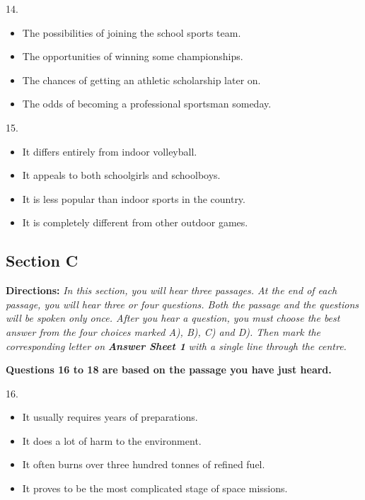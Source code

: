 \documentclass[UTF8,11pt]{ctexart}
\begin{document}
14.


\begin{itemize}[leftmargin=2em,itemsep=.2em,topsep=.4em]\item[A.] The possibilities of joining the school sports team.
\item[B.] The opportunities of winning some championships.
\item[C.] The chances of getting an athletic scholarship later on.
\item[D.] The odds of becoming a professional sportsman someday.
\end{itemize}

15.


\begin{itemize}[leftmargin=2em,itemsep=.2em,topsep=.4em]\item[A.] It differs entirely from indoor volleyball.
\item[B.] It appeals to both schoolgirls and schoolboys.
\item[C.] It is less popular than indoor sports in the country.
\item[D.] It is completely different from other outdoor games.
\end{itemize}

\subsection*{\textbf{Section C}}


\textbf{Directions:}\textit{ In this section, you will hear three passages. At the end of each passage, you will hear three or four} \textit{questions. Both the passage and the questions will be spoken only once. After you hear a question, you must} \textit{choose the best answer from the four choices marked A), B), C) and D). Then mark the corresponding letter on} \textbf{\textit{Answer Sheet 1}}\textit{ with a single line through the centre.}


\textbf{Questions 16 to 18 are based on the passage you have just heard.}


16.


\begin{itemize}[leftmargin=2em,itemsep=.2em,topsep=.4em]\item[A.] It usually requires years of preparations.
\item[B.] It does a lot of harm to the environment.
\item[C.] It often burns over three hundred tonnes of refined fuel.
\item[D.] It proves to be the most complicated stage of space missions.
\end{itemize}
\end{document}
